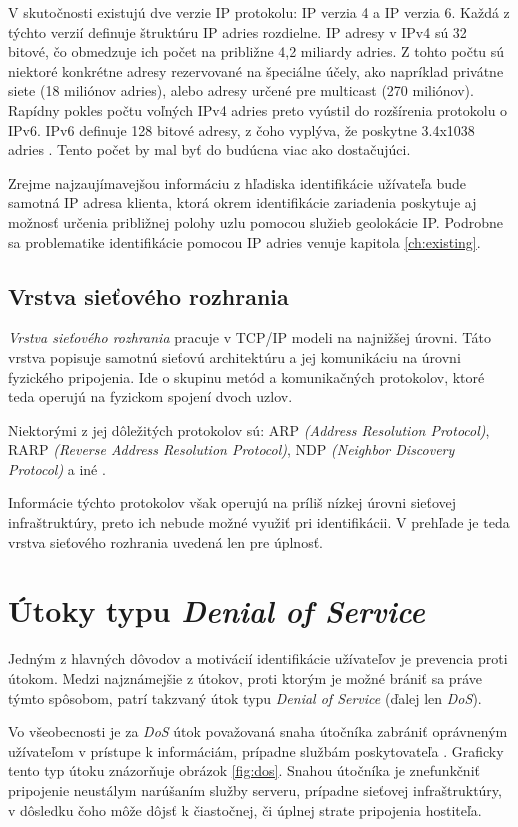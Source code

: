 \documentclass[
  digital, %
  oneside, %
  table,   %
  lof,     %
  nolot,   %
  nocover
]{fithesis3}
\begin{document}
V skutočnosti existujú dve verzie IP protokolu: IP verzia 4 a IP verzia 6.
Každá z týchto verzií definuje štruktúru IP adries rozdielne. IP adresy v IPv4
sú 32 bitové, čo obmedzuje ich počet na približne 4,2 miliardy adries. Z tohto
počtu sú niektoré konkrétne adresy rezervované na špeciálne účely, ako napríklad
privátne siete (18 miliónov adries), alebo adresy určené pre multicast
(270 miliónov). Rapídny pokles počtu voľných IPv4 adries preto vyústil do
rozšírenia protokolu o IPv6. IPv6 definuje 128 bitové adresy, z čoho vyplýva,
že poskytne 3.4x1038 adries \cite{rfc1752}. Tento počet by mal byť do budúcna viac ako
dostačujúci.

Zrejme najzaujímavejšou informáciu z hľadiska identifikácie užívateľa bude samotná IP
adresa klienta, ktorá okrem identifikácie zariadenia poskytuje aj možnosť určenia
približnej polohy uzlu pomocou služieb geolokácie IP. Podrobne sa problematike
identifikácie pomocou IP adries venuje kapitola \ref{ch:existing}. 

\section{Vrstva sieťového rozhrania}
\textit{Vrstva sieťového rozhrania} pracuje v TCP/IP modeli na najnižšej úrovni.
Táto vrstva popisuje samotnú sieťovú architektúru a jej komunikáciu na úrovni
fyzického pripojenia. Ide o skupinu metód a komunikačných protokolov, ktoré 
teda operujú na fyzickom spojení dvoch uzlov.

Niektorými z jej dôležitých protokolov sú: ARP
\textit{(Address Resolution Protocol)}, RARP
\textit{(Reverse Address Resolution Protocol)},
NDP \textit{(Neighbor Discovery Protocol)} a iné \cite{rfc1123}.

Informácie týchto protokolov však operujú na príliš nízkej úrovni sieťovej
infraštruktúry, preto ich nebude možné využiť pri identifikácii. V prehľade je 
teda vrstva sieťového rozhrania uvedená len pre úplnosť.

\chapter{Útoky typu \textit{Denial of Service}}
\label{ch:dos}
Jedným z hlavných dôvodov a motivácií identifikácie užívateľov je prevencia
proti útokom. Medzi najznámejšie z útokov, proti ktorým je možné brániť sa
práve týmto spôsobom, patrí takzvaný útok typu \textit{Denial of Service}
(ďalej len \textit{DoS}).

Vo všeobecnosti je za \textit{DoS} útok považovaná snaha útočníka zabrániť
oprávneným užívateľom v prístupe k informáciám, prípadne službám poskytovateľa \cite{McDowell:DoS}.
Graficky tento typ útoku znázorňuje obrázok \ref{fig:dos}.
Snahou útočníka je znefunkčniť pripojenie neustálym narúšaním služby serveru,
prípadne sieťovej infraštruktúry, v dôsledku čoho môže dôjsť k čiastočnej, či
úplnej strate pripojenia hostiteľa. 
\end{document}
